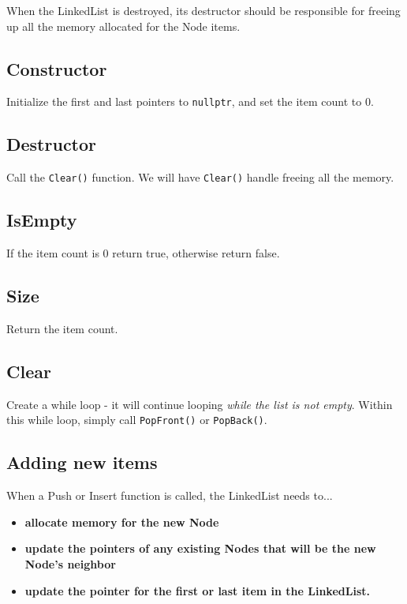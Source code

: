 \documentclass[a4paper,12pt,oneside]{book}
\begin{document}
        When the LinkedList is destroyed, its destructor should be responsible
        for freeing up all the memory allocated for the Node items.
    
    \subsection{Constructor}

        Initialize the first and last
        pointers to \texttt{nullptr}, and set the item count to 0.

    \subsection{Destructor}

        Call the \texttt{Clear()} function. We will have \texttt{Clear()}
        handle freeing all the memory.

    \subsection{IsEmpty}

    If the item count is 0 return true, otherwise return false.
    
    \subsection{Size}

    Return the item count.
    
    \subsection{Clear}
    
    Create a while loop - it will continue looping \textit{while
    the list is not empty}. Within this while loop, simply call
    \texttt{PopFront()} or \texttt{PopBack()}.
    
    
    \subsection{Adding new items}
    
        When a Push or Insert function is called, the LinkedList needs to...
        
        \begin{itemize}
            \item \textbf{allocate memory for the new Node}
            \item \textbf{update the pointers of any existing Nodes that will be the new Node's neighbor}
            \item \textbf{update the pointer for the first or last item in the LinkedList.}
        \end{itemize}
    
\end{document}

